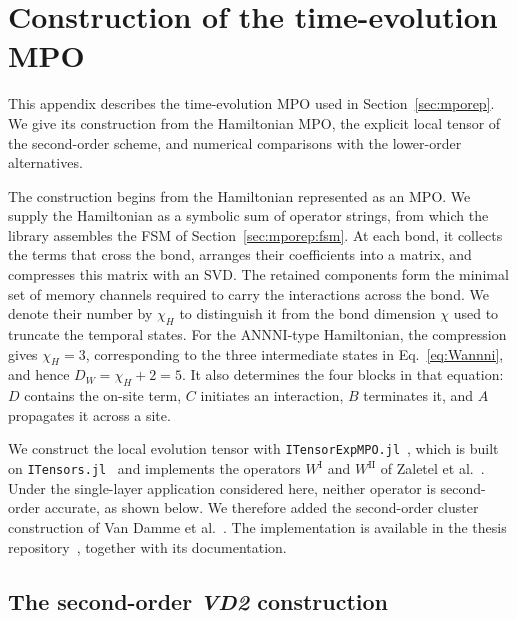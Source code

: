 

\FloatBarrier
\section{Construction of the time-evolution MPO}
\label{app:mpo}

This appendix describes the time-evolution \ac{MPO} used in Section~\ref{sec:mporep}. We give its construction from the Hamiltonian \ac{MPO}, the explicit local tensor of the second-order scheme, and numerical comparisons with the lower-order alternatives.

The construction begins from the Hamiltonian represented as an \ac{MPO}. We supply the Hamiltonian as a symbolic sum of operator strings, from which the library assembles the \ac{FSM} of Section~\ref{sec:mporep:fsm}. At each bond, it collects the terms that cross the bond, arranges their coefficients into a matrix, and compresses this matrix with an \ac{SVD}. The retained components form the minimal set of memory channels required to carry the interactions across the bond. We denote their number by $\chi_H$ to distinguish it from the bond dimension $\chi$ used to truncate the temporal states. For the \ac{ANNNI}-type Hamiltonian, the compression gives $\chi_H=3$, corresponding to the three intermediate states in Eq.~\eqref{eq:Wannni}, and hence $D_W=\chi_H+2=5$. It also determines the four blocks in that equation: $D$ contains the on-site term, $C$ initiates an interaction, $B$ terminates it, and $A$ propagates it across a site.

We construct the local evolution tensor with \texttt{ITensorExpMPO.jl}~\cite{pokart2024expmpo}, which is built on \texttt{ITensors.jl}~\cite{itensor2022} and implements the operators $W^{\mathrm{I}}$ and $W^{\mathrm{II}}$ of Zaletel et al.~\cite{zaletel2015}. Under the single-layer application considered here, neither operator is second-order accurate, as shown below. We therefore added the second-order cluster construction of Van Damme et al.~\cite{vandamme2024}. The implementation is available in the thesis repository~\cite{marquezolguin2026code}, together with its documentation.

\subsection{The second-order \textit{VD2} construction}
\label{app:mpo:vd2}

